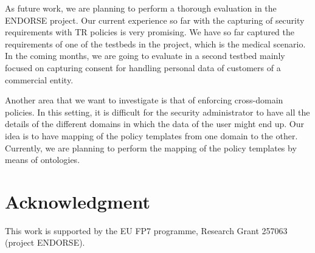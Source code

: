 \documentclass[10pt, conference, compsocconf]{IEEEtran}
\begin{document}
As future work, we are planning to perform a thorough evaluation in the ENDORSE project. Our current experience so far with the capturing of security requirements with TR policies is very promising. We have so far captured the requirements of one of the testbeds in the project, which is the medical scenario. In the coming months, we are going to evaluate in a second testbed mainly focused on capturing consent for handling personal data of customers of a commercial entity.

Another area that we want to investigate is that of enforcing cross-domain policies. In this setting, it is difficult for the security administrator to have all the details of the different domains in which the data of the user might end up. Our idea is to have mapping of the policy templates from one domain to the other. Currently, we are planning to perform the mapping of the policy templates by means of ontologies.

\section*{Acknowledgment}
This work is supported by the EU FP7 programme, Research Grant 257063 (project ENDORSE).



\end{document}
